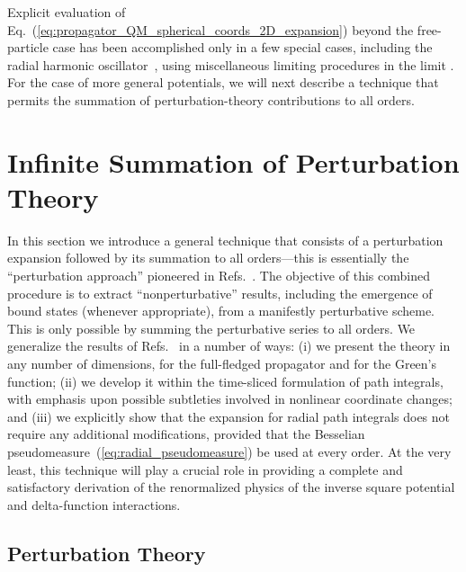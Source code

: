 \documentclass[a4paper,preprint,draft,showpacs,amsmath,amsfonts,amssymb,aps,prd]{revtex4}%
\begin{document}
Explicit evaluation of 
Eq.~(\ref{eq:propagator_QM_spherical_coords_2D_expansion}) 
beyond the free-particle case has been accomplished only in a few 
special cases, including the radial harmonic oscillator~\cite{gro:98},
using miscellaneous limiting procedures in the limit
\coordHE{}.
For the case of more general potentials, 
we will next describe a 
 technique that permits the summation of perturbation-theory
contributions to all orders.



\section{Infinite Summation of Perturbation Theory}
\label{sec:infinite_summation}


In this section we introduce a general 
technique that consists of a perturbation 
expansion followed by its summation to all orders---this is
essentially the ``perturbation approach'' pioneered in Refs.~\cite{bha:89,bha:88}.
The objective of this combined procedure is to extract ``nonperturbative''
results, including the emergence of bound states (whenever appropriate), from
a manifestly perturbative scheme.
This is only possible by summing the perturbative series to all orders.
We generalize the results of Refs.~\cite{bha:89,bha:88}  in a number of ways:
(i) we present the theory in any number of dimensions,
 for the full-fledged propagator and for the Green's function;
(ii) we develop it within the time-sliced formulation of path integrals,
with emphasis upon possible subtleties involved in nonlinear
coordinate changes;
and (iii) we explicitly show that the expansion for radial path integrals 
does not require any additional modifications, provided that the Besselian
pseudomeasure~(\ref{eq:radial_pseudomeasure}) be used at every order.
At the very least,
this technique will play a crucial role
in providing a complete and satisfactory derivation of the
renormalized physics of the inverse square potential and delta-function interactions.


\subsection{Perturbation Theory}
\label{sec:perturbation_theory}
\end{document}
